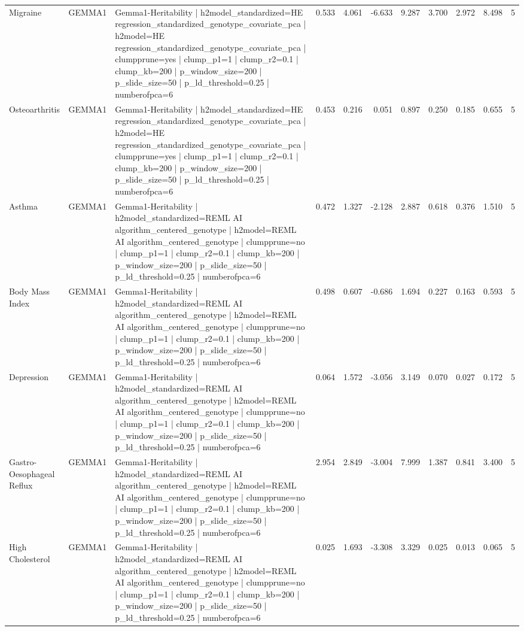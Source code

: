 \begin{landscape}
\begin{longtable}{p{2.4cm}p{1.8cm}p{6.0cm}rrrrrrrr}
Migraine & GEMMA1 & Gemma1-Heritability | h2model\_standardized=HE regression\_standardized\_genotype\_covariate\_pca | h2model=HE regression\_standardized\_genotype\_covariate\_pca | clumpprune=yes | clump\_p1=1 | clump\_r2=0.1 | clump\_kb=200 | p\_window\_size=200 | p\_slide\_size=50 | p\_ld\_threshold=0.25 | numberofpca=6 & 0.533 & 4.061 & -6.633 & 9.287 & 3.700 & 2.972 & 8.498 & 5 \\
Osteoarthritis & GEMMA1 & Gemma1-Heritability | h2model\_standardized=HE regression\_standardized\_genotype\_covariate\_pca | h2model=HE regression\_standardized\_genotype\_covariate\_pca | clumpprune=yes | clump\_p1=1 | clump\_r2=0.1 | clump\_kb=200 | p\_window\_size=200 | p\_slide\_size=50 | p\_ld\_threshold=0.25 | numberofpca=6 & 0.453 & 0.216 & 0.051 & 0.897 & 0.250 & 0.185 & 0.655 & 5 \\
Asthma & GEMMA1 & Gemma1-Heritability | h2model\_standardized=REML AI algorithm\_centered\_genotype | h2model=REML AI algorithm\_centered\_genotype | clumpprune=no | clump\_p1=1 | clump\_r2=0.1 | clump\_kb=200 | p\_window\_size=200 | p\_slide\_size=50 | p\_ld\_threshold=0.25 | numberofpca=6 & 0.472 & 1.327 & -2.128 & 2.887 & 0.618 & 0.376 & 1.510 & 5 \\
Body Mass Index & GEMMA1 & Gemma1-Heritability | h2model\_standardized=REML AI algorithm\_centered\_genotype | h2model=REML AI algorithm\_centered\_genotype | clumpprune=no | clump\_p1=1 | clump\_r2=0.1 | clump\_kb=200 | p\_window\_size=200 | p\_slide\_size=50 | p\_ld\_threshold=0.25 | numberofpca=6 & 0.498 & 0.607 & -0.686 & 1.694 & 0.227 & 0.163 & 0.593 & 5 \\
Depression & GEMMA1 & Gemma1-Heritability | h2model\_standardized=REML AI algorithm\_centered\_genotype | h2model=REML AI algorithm\_centered\_genotype | clumpprune=no | clump\_p1=1 | clump\_r2=0.1 | clump\_kb=200 | p\_window\_size=200 | p\_slide\_size=50 | p\_ld\_threshold=0.25 | numberofpca=6 & 0.064 & 1.572 & -3.056 & 3.149 & 0.070 & 0.027 & 0.172 & 5 \\
Gastro-Oesophageal Reflux & GEMMA1 & Gemma1-Heritability | h2model\_standardized=REML AI algorithm\_centered\_genotype | h2model=REML AI algorithm\_centered\_genotype | clumpprune=no | clump\_p1=1 | clump\_r2=0.1 | clump\_kb=200 | p\_window\_size=200 | p\_slide\_size=50 | p\_ld\_threshold=0.25 | numberofpca=6 & 2.954 & 2.849 & -3.004 & 7.999 & 1.387 & 0.841 & 3.400 & 5 \\
High Cholesterol & GEMMA1 & Gemma1-Heritability | h2model\_standardized=REML AI algorithm\_centered\_genotype | h2model=REML AI algorithm\_centered\_genotype | clumpprune=no | clump\_p1=1 | clump\_r2=0.1 | clump\_kb=200 | p\_window\_size=200 | p\_slide\_size=50 | p\_ld\_threshold=0.25 | numberofpca=6 & 0.025 & 1.693 & -3.308 & 3.329 & 0.025 & 0.013 & 0.065 & 5 \\

\end{longtable}
\end{landscape}
